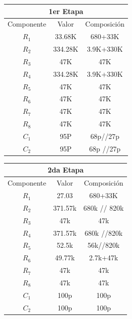 \begin{table}[H]
\centering
\begin{tabular}{ccc}
\multicolumn{3}{c}{1er Etapa}                                              \\ \hline
\multicolumn{1}{c|}{Componente} & \multicolumn{1}{c|}{Valor} & Composición \\ \hline
$R_1$                           & 33.68K                     & 680+33K     \\
$R_2$                           & 334.28K                    & 3.9K+330K   \\
$R_3$                           & 47K                        & 47K         \\
$R_4$                           & 334.28K                    & 3.9K+330K   \\
$R_5$                           & 47K                        & 47K         \\
$R_6$                           & 47K                        & 47K         \\
$R_7$                           & 47K                        & 47K         \\
$R_8$                           & 47K                        & 47K         \\
$C_1$                           & 95P                        & 68p//27p     \\
$C_2$                           & 95P                        & 68p //27p    
\end{tabular}
\end{table}
\begin{table}[H]
\centering
\begin{tabular}{ccc}
\multicolumn{3}{c}{2da Etapa}                                               \\ \hline
\multicolumn{1}{c|}{Componente} & \multicolumn{1}{c|}{Valor} & Composición  \\ \hline
$R_1$                           & 27.03                      & 680+33K      \\
$R_2$                           & 371.57k                    & 680k // 820k \\
$R_3$                           & 47k                        & 47k          \\
$R_4$                           & 371.57k                    & 680k //820k   \\
$R_5$                           & 52.5k                      & 56k//820k    \\
$R_6$                           & 49.77k                     & 2.7k+47k     \\
$R_7$                           & 47k                        & 47k          \\
$R_8$                           & 47k                        & 47k          \\
$C_1$                           & 100p                       & 100p         \\
$C_2$                           & 100p                       & 100p        
\end{tabular}
\end{table}
